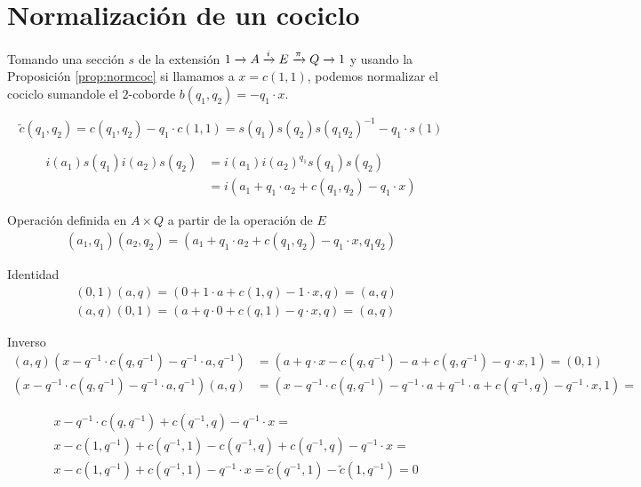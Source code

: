 \chapter{Normalización de un cociclo}\label{apen:norm}

Tomando una sección $s$ de la extensión $\extension i \pi A E Q$ y usando la Proposición \ref{prop:normcoc} si llamamos a $x = c(1,1)$, podemos normalizar el cociclo sumandole el $2$-coborde $b(q_1,q_2) = -q_1\cdot x$.

\begin{equation}
	\tilde c(q_1,q_2) = c(q_1,q_2) - q_1\cdot c(1,1) = s(q_1)s(q_2)s(q_1q_2)^{-1} - q_1\cdot s(1)
\end{equation}

\begin{align*}
	i(a_1)s(q_1)i(a_2)s(q_2) &= i(a_1)i(a_2)^{q_1}s(q_1)s(q_2) \\
	&= i(a_1 + q_1\cdot a_2 + c(q_1,q_2) - q_1\cdot x)
\end{align*}


Operación definida en $A\times Q$ a partir de la operación de $E$
\begin{align*}
	(a_1,q_1)(a_2,q_2) = (a_1+q_1\cdot a_2 + c(q_1,q_2) - q_1\cdot x,q_1q_2)
\end{align*}
	
Identidad
\begin{align*}
	&(0,1)(a,q) = (0 + 1\cdot a + c(1,q) - 1\cdot x,q) = (a,q) \\
	&(a,q)(0,1) = (a+q\cdot 0 + c(q,1) - q\cdot x,q) = (a,q)
\end{align*}
	
Inverso
\begin{align*}
	(a,q)(x-q^{-1}\cdot c(q,q^{-1}) - q^{-1}\cdot a,q^{-1}) &= (a + q\cdot x - c(q,q^{-1}) -a + c(q,q^{-1}) - q\cdot x, 1) = (0,1) \\
	(x-q^{-1}\cdot c(q,q^{-1}) - q^{-1}\cdot a,q^{-1})(a,q) &= (x-q^{-1}\cdot c(q,q^{-1}) - q^{-1}\cdot a + q^{-1}\cdot a + c(q^{-1},q) - q^{-1}\cdot x, 1) =
\end{align*}

\begin{align*}
	&x -q^{-1}\cdot c(q,q^{-1}) + c(q^{-1},q) - q^{-1}\cdot x = \\
	&x - c(1,q^{-1}) + c(q^{-1},1) - c(q^{-1},q) + c(q^{-1},q) - q^{-1}\cdot x = \\
	&x - c(1,q^{-1}) + c(q^{-1},1) - q^{-1}\cdot x = \tilde c(q^{-1},1)-\tilde c(1,q^{-1}) = 0
\end{align*}
	
